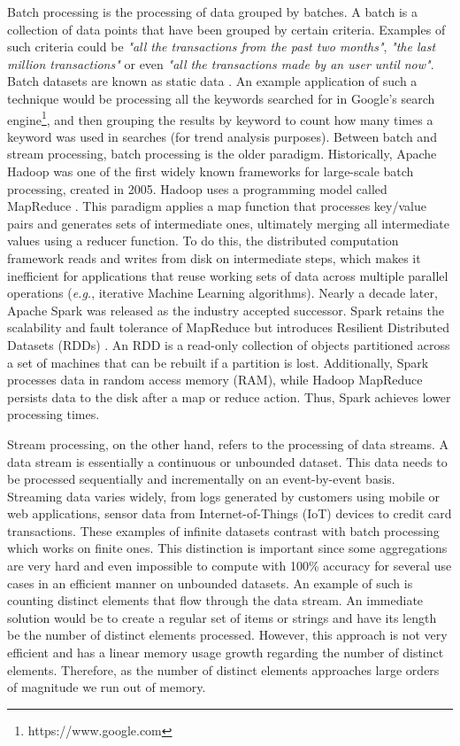 Batch processing is the processing of data grouped by batches. A batch is a collection of data points that have been grouped by certain criteria. Examples of such criteria could be \textit{"all the transactions from the past two months"}, \textit{"the last million transactions"} or even \textit{"all the transactions made by an user until now"}. Batch datasets are known as static data \cite{Martin-Batch-Defin}. An example application of such a technique would be processing all the keywords searched for in Google's search engine\footnote{https://www.google.com}, and then grouping the results by keyword to count how many times a keyword was used in searches (for trend analysis purposes). Between batch and stream processing, batch processing is the older paradigm. Historically, Apache Hadoop \cite{borthakur2007hadoop, Hadoop, ApacheHadoop} was one of the first widely known frameworks for large-scale batch processing, created in 2005. Hadoop uses a programming model called MapReduce \cite{MapReduce}. This paradigm applies a map function that processes key/value pairs and generates sets of intermediate ones, ultimately merging all intermediate values
using a reducer function. To do this, the distributed computation framework reads and writes from disk on intermediate steps, which makes it inefficient for applications that reuse working sets of data across multiple parallel operations (\textit{e.g.}, iterative Machine Learning algorithms). Nearly a decade later, Apache Spark \cite{ApacheSpark, Spark} was released as the industry accepted successor.
Spark retains the scalability and fault tolerance of MapReduce but introduces Resilient Distributed Datasets (RDDs) \cite{SparkRDDs}. An RDD is a read-only collection of objects partitioned across a set of machines that can be rebuilt if a partition is lost.
Additionally, Spark processes data in random access memory (RAM), while Hadoop MapReduce persists data to the disk after a map or reduce action. Thus, Spark achieves lower processing times. 

Stream processing, on the other hand, refers to the processing of data streams. A data stream is essentially a continuous or unbounded dataset. This data needs to be processed sequentially and incrementally on an event-by-event basis. Streaming data varies widely, from logs generated by customers using mobile or web applications, sensor data from Internet-of-Things (IoT) devices to credit card transactions. These examples of infinite datasets contrast with batch processing which works on finite ones. This distinction is important since some aggregations are very hard and even impossible to compute with 100\% accuracy for several use cases in an efficient manner on unbounded datasets. An example of such is counting distinct elements that flow through the data stream. An immediate solution would be to create a regular set of items or strings and have its length be the number of distinct elements processed. However, this approach is not very efficient and has a linear memory usage growth regarding the number of distinct elements. Therefore, as the number of distinct elements approaches large orders of magnitude we run out of memory.

